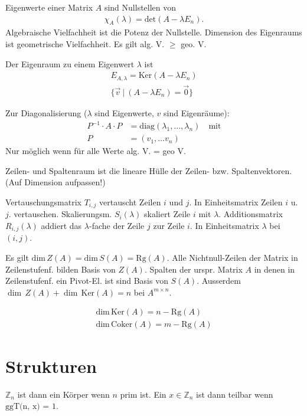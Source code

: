 \documentclass{article}
\begin{document}
\begin{multicols}{2}
Eigenwerte einer Matrix $A$ sind Nullstellen von
\begin{align*}
    \chi_A(\lambda) = \text{det}(A - \lambda E_n).
\end{align*}
Algebraische Vielfachheit ist die Potenz der Nullstelle. Dimension des Eigenraums ist geometrische Vielfachheit. Es gilt alg. V. $\geq$ geo. V.

Der Eigenraum zu einem Eigenwert $\lambda$ ist
\begin{align*}
    E_{A,\lambda} = \text{Ker}(A - \lambda E_n) \\
    \{ \vec{v}\ |\ (A - \lambda E_n) = \vec{0} \}
\end{align*}

Zur Diagonalisierung ($\lambda$ sind Eigenwerte, $v$ sind Eigenräume):
\begin{align*}
    P^{-1} \cdot A \cdot P &= \text{diag}(\lambda_1, \ldots, \lambda_n) \quad \text{mit} \\ 
    P &= (v_1, \ldots v_n)
\end{align*}
Nur möglich wenn für alle Werte alg. V. = geo V.

Zeilen- und Spaltenraum ist die lineare Hülle der Zeilen- bzw. Spaltenvektoren. (Auf Dimension aufpassen!)

Vertauschungsmatrix $T_{i,j}$ vertauscht Zeilen $i$ und $j$. In Einheitsmatrix Zeilen $i$ u. $j.$ vertauschen. Skalierungsm. $S_i(\lambda)$ skaliert Zeile $i$ mit $\lambda$. Additionsmatrix $R_{i,j}(\lambda)$ addiert das $\lambda$-fache der Zeile $j$ zur Zeile $i$. In Einheitsmatrix $\lambda$ bei $(i, j)$.

Es gilt $\text{dim}\,Z(A) = \text{dim}\,S(A) = \text{Rg}(A)$. Alle Nichtnull-Zeilen der Matrix in Zeilenstufenf. bilden Basis von $Z(A)$. Spalten der urspr. Matrix $A$ in denen in Zeilenstufenf. ein Pivot-El. ist sind Basis von $S(A)$. Ausserdem $\dim\,Z(A) + \dim\,\text{Ker}(A) = n$ bei $A^{m \times n}$.

\begin{align*}
    \text{dim}\,\text{Ker}(A) = n - \text{Rg}(A) \\
    \text{dim}\,\text{Coker}(A) = m - \text{Rg}(A)
\end{align*}

\section*{Strukturen}

$\mathbb{Z}_n$ ist dann ein Körper wenn $n$ prim ist. Ein $x \in \mathbb{Z}_n$ ist dann teilbar wenn $\text{ggT(n, x) = 1}$.


\end{multicols}
\end{document}
